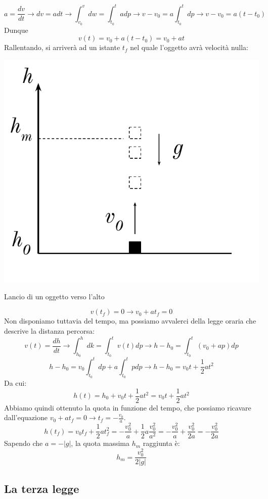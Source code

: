 \[ a = \frac{dv}{dt} \to dv = adt \to \int_{v_0}^{v}dw = \int_{t_0}^{t}adp \to v - v_0 = a\int_{t_0}^{t}dp \to v - v_0 = a(t - t_0) \]
Dunque
\[ v(t) = v_0 + a(t - t_0) = v_0 + at \]
Rallentando, si arriverà ad un istante $t_f$ nel quale l'oggetto avrà velocità
nulla:
\begin{marginfigure}
    \centering
    \includegraphics[width = \marginparwidth]{figures/greve.pdf}
    \caption{Lancio di un oggetto verso l'alto}
    \label{lanciobasso}
\end{marginfigure}
\[ v(t_f) = 0 \to v_0 + at_f = 0 \]
Non disponiamo tuttavia del tempo, ma possiamo avvalerci della legge oraria
che descrive la distanza percorsa:
\[ v(t) = \frac{dh}{dt} \to \int_{h_0}^{h}dk = \int_{t_0}^{t}v(t)dp \to h - h_0 = \int_{t_0}^{t}(v_0 + ap)dp \]
\[ h - h_0 = v_0\int_{t_0}^{t}dp + a\int_{t_0}^{t}pdp \to h - h_0 = v_0t + \frac12 at^2 \]
Da cui:
\[ h(t) = h_0 + v_0t + \frac12 at^2 = v_0t + \frac12 at^2 \]
Abbiamo quindi ottenuto la quota in funzione del tempo, che possiamo ricavare
dall'equazione $v_0 + at_f = 0 \to t_f = -\frac{v_0}{a}$.
\[ h(t_f) = v_0t_f + \frac12 at_{f}^2 =  -\frac{v_0^2}{a} + \frac{1}{2}a\frac{v_0^2}{a^2} = -\frac{v_0^2}{a} + \frac{v_0^2}{2a} = -\frac{v_0^2}{2a} \]
Sapendo che $a = -|g|$, la quota massima $h_m$ raggiunta è:
\[ h_m = \frac{v_0^2}{2|g|} \]

\subsection{La terza legge}